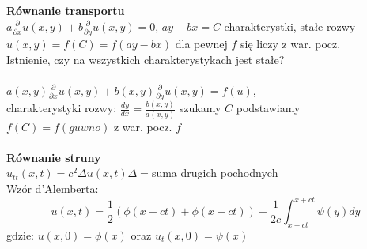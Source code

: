 \documentclass{article}
\begin{document}
\textbf{Równanie transportu}\\
$a\frac{\partial}{\partial x}u(x,y) + b \frac{\partial}{\partial y} u(x,y) = 0$, $ay-bx=C$ charakterystki, stałe rozwy\\
$u(x,y) = f(C) = f(ay-bx)$ dla pewnej $f$ się liczy z war. pocz.\\
Istnienie, czy na wszystkich charakterystykach jest stałe?\\\\
$a(x,y)\frac{\partial}{\partial x}u(x,y) + b(x,y) \frac{\partial}{\partial y} u(x,y) = f(u)$,\\
charakterystyki rozwy: $\frac{dy}{dx} = \frac{b(x,y)}{a(x,y)}$ szukamy $C$ podstawiamy $f(C) = f(guwno)$ z war. pocz. $f$\\\\
\textbf{Równanie struny}\\
$u_{tt}(x,t) = c^2 \Delta u(x,t)$\quad$\Delta=$suma drugich pochodnych\\
Wzór d'Alemberta: $$u(x,t)=\frac{1}{2}(\phi(x+ct)+\phi(x-ct)) +\frac{1}{2c}\int_{x-ct}^{x+ct}\psi(y)dy$$
gdzie: $u(x,0) = \phi(x)$ oraz $u_t(x,0) = \psi(x)$
\end{document}
